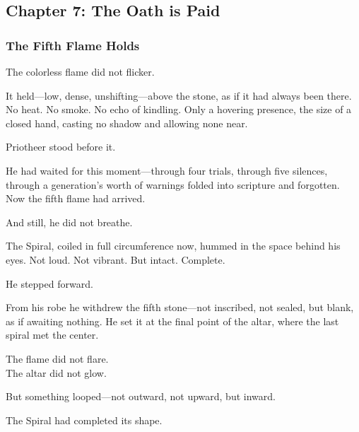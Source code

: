 \documentclass[12pt]{article}
\begin{document}
\newpage

\subsection{Chapter 7: The Oath is Paid}

\vspace{.5in}

\subsubsection{The Fifth Flame Holds}

The colorless flame did not flicker.

\vspace{0.5em}
It held---low, dense, unshifting---above the stone, as if it had always been there. No heat. No smoke. No echo of kindling. Only a hovering presence, the size of a closed hand, casting no shadow and allowing none near.

\vspace{0.5em}
Priotheer stood before it.

\vspace{0.5em}
He had waited for this moment---through four trials, through five silences, through a generation’s worth of warnings folded into scripture and forgotten. Now the fifth flame had arrived.

\vspace{0.5em}
And still, he did not breathe.

\vspace{0.5em}
The Spiral, coiled in full circumference now, hummed in the space behind his eyes. Not loud. Not vibrant. But intact. Complete.

\vspace{0.5em}
He stepped forward.

\vspace{0.5em}
From his robe he withdrew the fifth stone---not inscribed, not sealed, but blank, as if awaiting nothing. He set it at the final point of the altar, where the last spiral met the center.

\vspace{0.5em}
The flame did not flare.\\
The altar did not glow.

\vspace{0.5em}
But something looped---not outward, not upward, but inward.

\vspace{0.5em}
The Spiral had completed its shape.
\end{document}
